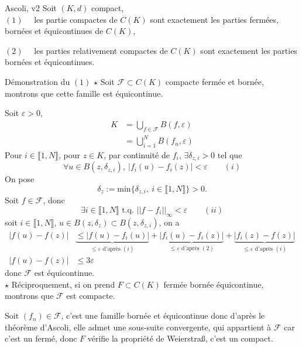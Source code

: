 \documentclass[a4paper,11pt, twoside]{article}
\begin{document}
\begin{thC}{Ascoli, v2}
  Soit $(K,d)$ compact,\\

  $(\mathit 1)\quad$ les partie compactes de $C(K)$ sont exactement les parties fermées, bornées et équicontinues de $C(K)$,

  $(\mathit 2)\quad$ les parties relativement compactes de $C(K)$ sont exactement les parties bornées et équicontinues.
\end{thC}


\begin{ProofC}{Démonstration du $(\mathit 1)$}
  $\star$ Soit $\mathcal F\subset C(K)$ compacte fermée et bornée, montrons que cette famille est équicontinue. 
  
  Soit $\varepsilon>0$,
  \begin{align*}
    K&=\bigcup_{f\in\mathcal F}B(f,\varepsilon)\\
    &=\bigcup_{i=1}^NB(f_n,\varepsilon)
  \end{align*}
  Pour $i\in\llbracket 1,N\rrbracket$, pour $z\in K$, par continuité de $f_i$, $\exists \delta_{z,i}>0$ tel que 
  $$\forall u \in B(z,\delta_{z,i}),\ \left|f_i(u)-f_i(z)\right|<\varepsilon\qquad (i)$$
  On pose 
  $$\delta_z:=\mathrm{min}\{\delta_{z,i},\ i\in\llbracket 1,N\rrbracket\}>0.$$
  Soit $f\in\mathcal F$, donc 
  $$\exists i\in \llbracket 1,N\rrbracket\text{ t.q. }||f-f_i||_{\infty}<\varepsilon\qquad (ii)$$
  soit $i\in \llbracket 1,N\rrbracket$, $u\in B(z,\delta_z)\subset B(z,\delta_{z,i})$, on a 
  \begin{align*}
    |f(u)-f(z)|&\underbrace{\leqslant|f(u)-f_i(u)|}_{\leqslant\varepsilon\text{ d'après }(i)}+\underbrace{|f_i(u)-f_i(z)|}_{\leqslant\varepsilon\text{ d'après }(2)}+\underbrace{|f_i(z)-f(z)|}_{\leqslant\varepsilon\text{ d'après }(i)}\\
    |f(u)-f(z)|&\leqslant 3\varepsilon
  \end{align*}
  donc $\mathcal  F$ est équicontinue.\\

  $\star$ Réciproquement, si on prend $F\subset C(K)$ fermée bornée équicontinue, montrons que $\mathcal F$ est compacte.
  
  Soit $(f_n)\in \mathcal F$, c'est une famille bornée et équicontinue donc d'après le théorème d'Ascoli, elle admet une sous-suite convergente, qui appartient à $\mathcal F$ car c'est un fermé, donc $F$ vérifie la propriété de Weierstra\ss, c'est un compact.
\end{ProofC}
\end{document}
